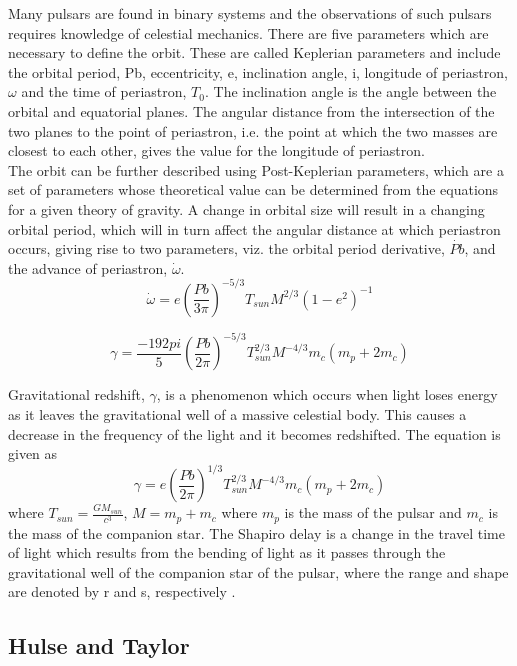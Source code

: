\documentclass[12pt]{article}
\begin{document}
	Many pulsars are found in binary systems and the observations of such pulsars requires knowledge of celestial mechanics. There are five parameters which are necessary to define the orbit. These are called Keplerian parameters and include the orbital period, Pb, eccentricity, e, inclination angle, i, longitude of periastron, $\omega$ and the time of periastron, $T_0$. The inclination angle is the angle between the orbital and equatorial planes. The angular distance from the intersection of the two planes to the point of periastron, i.e. the point at which the two masses are closest to each other, gives the value for the longitude of periastron.\\
	The orbit can be further described using Post-Keplerian parameters, which are a set of parameters whose theoretical value can be determined from the equations for a given theory of gravity. A change in orbital size will result in a changing orbital period, which will in turn affect the angular distance at which periastron occurs, giving rise to two parameters, viz. the orbital period derivative, $\dot{Pb}$, and the advance of periastron, $\dot{\omega}$. 
	\begin{equation}
	\dot{\omega}=e ({\frac{Pb}{3 \pi}})^{-5/3}{T_{sun}M}^{2/3}({1-e^2})^{-1}
	\end{equation}
	
	\begin{equation}
	\gamma=\frac{-192pi}{5} ({\frac{Pb}{2 \pi}})^{-5/3}T_{sun}^{2/3}M^{-4/3}m_c(m_p+2m_c)
	\end{equation}
	
	Gravitational redshift, $\gamma$, is a phenomenon which occurs when light loses energy as it leaves the gravitational well of a massive celestial body. This causes a decrease in the frequency of the light and it becomes redshifted. The equation is given as
	\begin{equation}\label{grav redshift}
	\gamma=e ({\frac{Pb}{2 \pi}})^{1/3}T_{sun}^{2/3}M^{-4/3}m_c(m_p+2m_c)
	\end{equation}
	where $T_{sun}=\frac{G M_{sun}}{c^3}$, $M=m_p+m_c$ where $m_p$ is the mass of the pulsar and $m_c$ is the mass of the companion star.
	The Shapiro delay is a change in the travel time of light which results from the bending of light as it passes through the gravitational well of the companion star of the pulsar, where the range and shape are denoted by r and s, respectively \cite{iorio2007post}. 
	
	\subsection{Hulse and Taylor}
	\label{sec:Hulse and Taylor}
	
\end{document}
